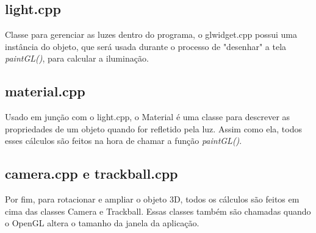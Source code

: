 \subsection{light.cpp}

Classe para gerenciar as luzes dentro do programa, o glwidget.cpp possui uma 
instância do objeto, que será usada durante o processo de "desenhar" a tela \emph{paintGL()}, para 
calcular a iluminação.

\subsection{material.cpp}

Usado em junção com o light.cpp, o Material é uma classe para descrever 
as propriedades de um objeto quando for refletido pela luz. Assim como ela, 
todos esses cálculos são feitos na hora de chamar a função \emph{paintGL()}.

\subsection{camera.cpp e trackball.cpp}

Por fim, para rotacionar e ampliar o objeto 3D, todos 
os cálculos são feitos em cima das classes Camera e Trackball. Essas classes 
também são chamadas quando o OpenGL altera o tamanho da janela da aplicação.

\newpage